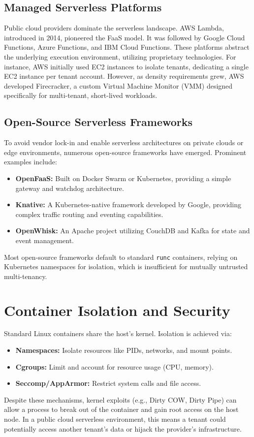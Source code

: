 \documentclass[12pt,a4paper]{report}
\begin{document}
\subsection{Managed Serverless Platforms}
Public cloud providers dominate the serverless landscape. AWS Lambda, introduced in 2014, pioneered the FaaS model. It was followed by Google Cloud Functions, Azure Functions, and IBM Cloud Functions. These platforms abstract the underlying execution environment, utilizing proprietary technologies. For instance, AWS initially used EC2 instances to isolate tenants, dedicating a single EC2 instance per tenant account. However, as density requirements grew, AWS developed Firecracker, a custom Virtual Machine Monitor (VMM) designed specifically for multi-tenant, short-lived workloads.

\subsection{Open-Source Serverless Frameworks}
To avoid vendor lock-in and enable serverless architectures on private clouds or edge environments, numerous open-source frameworks have emerged. Prominent examples include:
\begin{itemize}
    \item \textbf{OpenFaaS:} Built on Docker Swarm or Kubernetes, providing a simple gateway and watchdog architecture.
    \item \textbf{Knative:} A Kubernetes-native framework developed by Google, providing complex traffic routing and eventing capabilities.
    \item \textbf{OpenWhisk:} An Apache project utilizing CouchDB and Kafka for state and event management.
\end{itemize}
Most open-source frameworks default to standard \texttt{runc} containers, relying on Kubernetes namespaces for isolation, which is insufficient for mutually untrusted multi-tenancy.

\section{Container Isolation and Security}
Standard Linux containers share the host's kernel. Isolation is achieved via:
\begin{itemize}
    \item \textbf{Namespaces:} Isolate resources like PIDs, networks, and mount points.
    \item \textbf{Cgroups:} Limit and account for resource usage (CPU, memory).
    \item \textbf{Seccomp/AppArmor:} Restrict system calls and file access.
\end{itemize}
Despite these mechanisms, kernel exploits (e.g., Dirty COW, Dirty Pipe) can allow a process to break out of the container and gain root access on the host node. In a public cloud serverless environment, this means a tenant could potentially access another tenant's data or hijack the provider's infrastructure.
\end{document}
